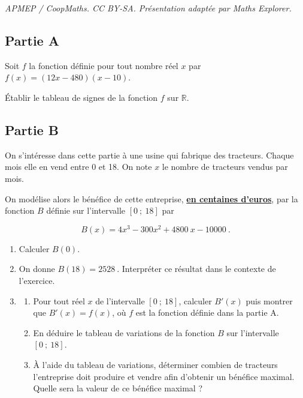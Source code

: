 \documentclass[10pt]{article}
\providecommand{\R}{\mathbb{R}}
\providecommand{\np}[2][]{{#2~#1}}
\begin{document}
\noindent\textit{APMEP / CoopMaths. CC BY-SA. Présentation adaptée par Maths Explorer.}\par\medskip
\subsection*{Partie A}

\begin{minipage}{0.7\linewidth}
	Soit $f$ la fonction définie pour tout nombre réel $x$ par $f(x) = (12x-480)(x-10)$.

	Établir le tableau de signes de la fonction $f$ sur $\R$.
\end{minipage}
\hfill
{}

\subsection*{Partie B}

On s'intéresse dans cette partie à une usine qui fabrique des tracteurs. Chaque mois elle en vend entre 0 et 18. On note $x$ le nombre de tracteurs vendus par mois.

On modélise alors le bénéfice de cette entreprise, \textbf{\uline{en centaines d'euros}}, par la fonction $B$ définie sur l'intervalle $[0~;~18]$ par 

\[ B(x) = 4x^3 - 300x^2 + \np{4800}x - \np{10000}. \]

\begin{enumerate}
	\item Calculer $B(0)$.
	\item On donne $B(18) = \np{2528}$. Interpréter ce résultat dans le contexte de l'exercice.
	\item
	\begin{enumerate}
		\item Pour tout réel $x$ de l'intervalle $[0 ~;~18]$, calculer $B'(x)$ puis montrer que $B'(x) = f(x)$, où $f$ est la fonction définie dans la partie A.
		\item En déduire le tableau de variations de la fonction $B$ sur l'intervalle $[0~;~18]$.
		\item À l'aide du tableau de variations, déterminer combien de tracteurs l'entreprise doit produire et vendre afin d'obtenir un bénéfice maximal. Quelle sera la valeur de ce bénéfice maximal ?
	\end{enumerate}
\end{enumerate}
\end{document}
